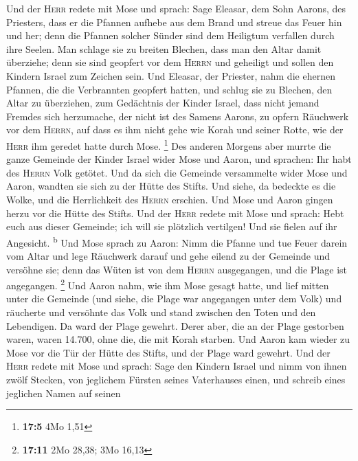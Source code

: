  Und der \textsc{Herr} redete mit Mose und sprach:
 Sage Eleasar, dem Sohn Aarons, des Priesters, dass er die
Pfannen aufhebe aus dem Brand und streue das Feuer hin und her;
 denn die Pfannen solcher Sünder sind dem Heiligtum
verfallen durch ihre Seelen. Man schlage sie zu breiten Blechen, dass
man den Altar damit überziehe; denn sie sind geopfert vor dem
\textsc{Herrn} und geheiligt und sollen den Kindern Israel zum Zeichen
sein.  Und Eleasar, der Priester, nahm die ehernen
Pfannen, die die Verbrannten geopfert hatten, und schlug sie zu Blechen,
den Altar zu überziehen,  zum Gedächtnis der Kinder
Israel, dass nicht jemand Fremdes sich herzumache, der nicht ist des
Samens Aarons, zu opfern Räuchwerk vor dem \textsc{Herrn}, auf dass es
ihm nicht gehe wie Korah und seiner Rotte, wie der \textsc{Herr} ihm
geredet hatte durch Mose. \footnote{\textbf{17:5} 4Mo 1,51}
 Des anderen Morgens aber murrte die ganze Gemeinde der
Kinder Israel wider Mose und Aaron, und sprachen: Ihr habt des
\textsc{Herrn} Volk getötet.  Und da sich die Gemeinde
versammelte wider Mose und Aaron, wandten sie sich zu der Hütte des
Stifts. Und siehe, da bedeckte es die Wolke, und die Herrlichkeit des
\textsc{Herrn} erschien.  Und Mose und Aaron gingen herzu
vor die Hütte des Stifts.  Und der \textsc{Herr} redete
mit Mose und sprach:  Hebt euch aus dieser Gemeinde; ich
will sie plötzlich vertilgen! Und sie fielen auf ihr Angesicht.
\textsuperscript{b}  Und Mose sprach zu Aaron: Nimm die
Pfanne und tue Feuer darein vom Altar und lege Räuchwerk darauf und gehe
eilend zu der Gemeinde und versöhne sie; denn das Wüten ist von dem
\textsc{Herrn} ausgegangen, und die Plage ist angegangen. \footnote{\textbf{17:11}
  2Mo 28,38; 3Mo 16,13}  Und Aaron nahm, wie ihm Mose
gesagt hatte, und lief mitten unter die Gemeinde (und siehe, die Plage
war angegangen unter dem Volk) und räucherte und versöhnte das Volk
 und stand zwischen den Toten und den Lebendigen. Da ward
der Plage gewehrt.  Derer aber, die an der Plage
gestorben waren, waren 14.700, ohne die, die mit Korah starben.
 Und Aaron kam wieder zu Mose vor die Tür der Hütte des
Stifts, und der Plage ward gewehrt.  Und der
\textsc{Herr} redete mit Mose und sprach:  Sage den
Kindern Israel und nimm von ihnen zwölf Stecken, von jeglichem Fürsten
seines Vaterhauses einen, und schreib eines jeglichen Namen auf seinen
